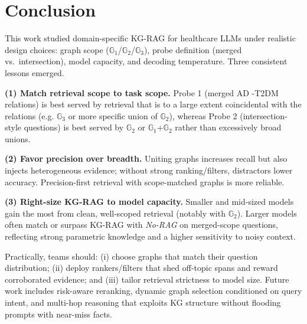 \section{Conclusion}

This work studied domain-specific KG-RAG for healthcare LLMs under realistic design choices: graph scope ($\mathbb{G}_1$/$\mathbb{G}_2$/$\mathbb{G}_3$), probe definition (merged vs.\ intersection), model capacity, and decoding temperature. Three consistent lessons emerged.

\textbf{(1) Match retrieval scope to task scope.} Probe 1 (merged AD -T2DM relations) is best served by retrieval that is to a large extent coincidental with the relations (e.g. $\mathbb{G}_3$ or more specific union of $\mathbb{G}_2$), whereas Probe 2 (intersection-style questions) is best served by $\mathbb{G}_2$ or $\mathbb{G}_1$+$\mathbb{G}_2$ rather than excessively broad unions.

\textbf{(2) Favor precision over breadth.} Uniting graphs increases recall but also injects heterogeneous evidence; without strong ranking/filters, distractors lower accuracy. Precision-first retrieval with scope-matched graphs is more reliable.

\textbf{(3) Right-size KG-RAG to model capacity.} Smaller and mid-sized models gain the most from clean, well-scoped retrieval (notably with $\mathbb{G}_2$). Larger models often match or surpass KG-RAG with \textit{No-RAG} on merged-scope questions, reflecting strong parametric knowledge and a higher sensitivity to noisy context.

 Practically, teams should: (i) choose graphs that match their question distribution; (ii) deploy rankers/filters that shed off-topic spans and reward corroborated evidence; and (iii) tailor retrieval strictness to model size. Future work includes risk-aware reranking, dynamic graph selection conditioned on query intent, and multi-hop reasoning that exploits KG structure without flooding prompts with near-miss facts.
